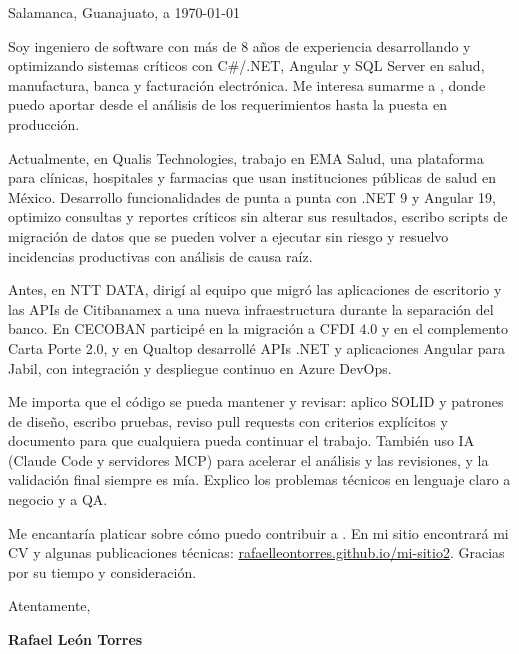\documentclass[es,11pt]{yaac-rl}
\begin{document}
\raggedright
\makecvheader

\hfill Salamanca, Guanajuato, a \today


Soy ingeniero de software con más de 8 años de experiencia desarrollando y optimizando sistemas críticos con C\#/.NET, Angular y SQL Server en salud, manufactura, banca y facturación electrónica. Me interesa sumarme a  , donde puedo aportar desde el análisis de los requerimientos hasta la puesta en producción.

Actualmente, en Qualis Technologies, trabajo en EMA Salud, una plataforma para clínicas, hospitales y farmacias que usan instituciones públicas de salud en México. Desarrollo funcionalidades de punta a punta con .NET 9 y Angular 19, optimizo consultas y reportes críticos sin alterar sus resultados, escribo scripts de migración de datos que se pueden volver a ejecutar sin riesgo y resuelvo incidencias productivas con análisis de causa raíz.

Antes, en NTT DATA, dirigí al equipo que migró las aplicaciones de escritorio y las APIs de Citibanamex a una nueva infraestructura durante la separación del banco. En CECOBAN participé en la migración a CFDI 4.0 y en el complemento Carta Porte 2.0, y en Qualtop desarrollé APIs .NET y aplicaciones Angular para Jabil, con integración y despliegue continuo en Azure DevOps.

Me importa que el código se pueda mantener y revisar: aplico SOLID y patrones de diseño, escribo pruebas, reviso pull requests con criterios explícitos y documento para que cualquiera pueda continuar el trabajo. También uso IA (Claude Code y servidores MCP) para acelerar el análisis y las revisiones, y la validación final siempre es mía. Explico los problemas técnicos en lenguaje claro a negocio y a QA.

Me encantaría platicar sobre cómo puedo contribuir a . En mi sitio encontrará mi CV y algunas publicaciones técnicas: \href{https://rafaelleontorres.github.io/mi-sitio2/}{rafaelleontorres.github.io/mi-sitio2}. Gracias por su tiempo y consideración.

Atentamente,

\medskip
\textbf{Rafael León Torres}
\end{document}

